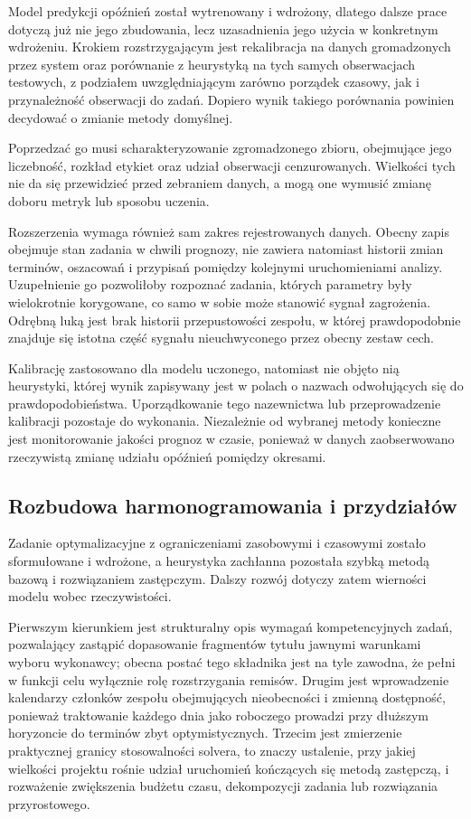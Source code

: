 Model predykcji opóźnień został wytrenowany i wdrożony, dlatego dalsze prace dotyczą już nie jego zbudowania, lecz uzasadnienia jego użycia w konkretnym wdrożeniu. Krokiem rozstrzygającym jest rekalibracja na danych gromadzonych przez system oraz porównanie z heurystyką na tych samych obserwacjach testowych, z podziałem uwzględniającym zarówno porządek czasowy, jak i przynależność obserwacji do zadań. Dopiero wynik takiego porównania powinien decydować o zmianie metody domyślnej.

Poprzedzać go musi scharakteryzowanie zgromadzonego zbioru, obejmujące jego liczebność, rozkład etykiet oraz udział obserwacji cenzurowanych. Wielkości tych nie da się przewidzieć przed zebraniem danych, a mogą one wymusić zmianę doboru metryk lub sposobu uczenia.

Rozszerzenia wymaga również sam zakres rejestrowanych danych. Obecny zapis obejmuje stan zadania w chwili prognozy, nie zawiera natomiast historii zmian terminów, oszacowań i przypisań pomiędzy kolejnymi uruchomieniami analizy. Uzupełnienie go pozwoliłoby rozpoznać zadania, których parametry były wielokrotnie korygowane, co samo w sobie może stanowić sygnał zagrożenia. Odrębną luką jest brak historii przepustowości zespołu, w której prawdopodobnie znajduje się istotna część sygnału nieuchwyconego przez obecny zestaw cech.

Kalibrację zastosowano dla modelu uczonego, natomiast nie objęto nią heurystyki, której wynik zapisywany jest w polach o nazwach odwołujących się do prawdopodobieństwa. Uporządkowanie tego nazewnictwa lub przeprowadzenie kalibracji pozostaje do wykonania. Niezależnie od wybranej metody konieczne jest monitorowanie jakości prognoz w czasie, ponieważ w danych zaobserwowano rzeczywistą zmianę udziału opóźnień pomiędzy okresami.

\subsection{Rozbudowa harmonogramowania i przydziałów}

Zadanie optymalizacyjne z ograniczeniami zasobowymi i czasowymi zostało sformułowane i wdrożone, a heurystyka zachłanna pozostała szybką metodą bazową i rozwiązaniem zastępczym. Dalszy rozwój dotyczy zatem wierności modelu wobec rzeczywistości.

Pierwszym kierunkiem jest strukturalny opis wymagań kompetencyjnych zadań, pozwalający zastąpić dopasowanie fragmentów tytułu jawnymi warunkami wyboru wykonawcy; obecna postać tego składnika jest na tyle zawodna, że pełni w funkcji celu wyłącznie rolę rozstrzygania remisów. Drugim jest wprowadzenie kalendarzy członków zespołu obejmujących nieobecności i zmienną dostępność, ponieważ traktowanie każdego dnia jako roboczego prowadzi przy dłuższym horyzoncie do terminów zbyt optymistycznych. Trzecim jest zmierzenie praktycznej granicy stosowalności solvera, to znaczy ustalenie, przy jakiej wielkości projektu rośnie udział uruchomień kończących się metodą zastępczą, i rozważenie zwiększenia budżetu czasu, dekompozycji zadania lub rozwiązania przyrostowego.

